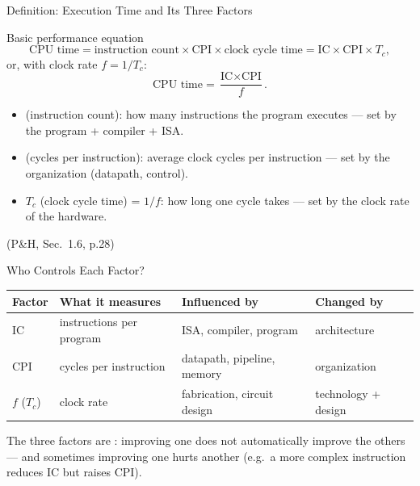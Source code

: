 \documentclass[aspectratio=169]{beamer}
\begin{document}
\begin{frame}{Definition: Execution Time and Its Three Factors}
  \begin{block}{Basic performance equation}
    \[
      \text{CPU time} = \text{instruction count} \times \text{CPI} \times
      \text{clock cycle time} = \text{IC} \times \text{CPI} \times T_c,
    \]
    or, with clock rate $f = 1/T_c$:
    \[
      \text{CPU time} = \frac{\text{IC} \times \text{CPI}}{f}.
    \]
  \end{block}
  \begin{itemize}
    \item {} (instruction count): how many instructions the program
      executes --- set by the program + compiler + ISA.
    \item {} (cycles per instruction): average clock cycles per
      instruction --- set by the organization (datapath, control).
    \item $T_c$ (clock cycle time) = $1/f$: how long one cycle takes --- set by
      the clock rate of the hardware.
  \end{itemize}
  (P\&H, Sec.~1.6, p.28) \cite{PattersonHennessy2017_computer_organization_design}
\end{frame}

\begin{frame}{Who Controls Each Factor?}
  \begin{center}
    \small
    \begin{tabular}{@{}p{2.2cm}p{3.0cm}p{3.2cm}p{2.9cm}@{}}
      \toprule
      \textbf{Factor} & \textbf{What it measures} & \textbf{Influenced by} & \textbf{Changed by} \\
      \midrule
      $\text{IC}$ & instructions per program & ISA, compiler, program & architecture \\
      $\text{CPI}$ & cycles per instruction & datapath, pipeline, memory & organization \\
      $f$ ($T_c$) & clock rate & fabrication, circuit design & technology + design \\
      \bottomrule
    \end{tabular}
  \end{center}
  \vspace{0.3cm}
  The three factors are : improving one does not automatically
  improve the others --- and sometimes improving one hurts another (e.g.\ a
  more complex instruction reduces IC but raises CPI).
\end{frame}
\end{document}
